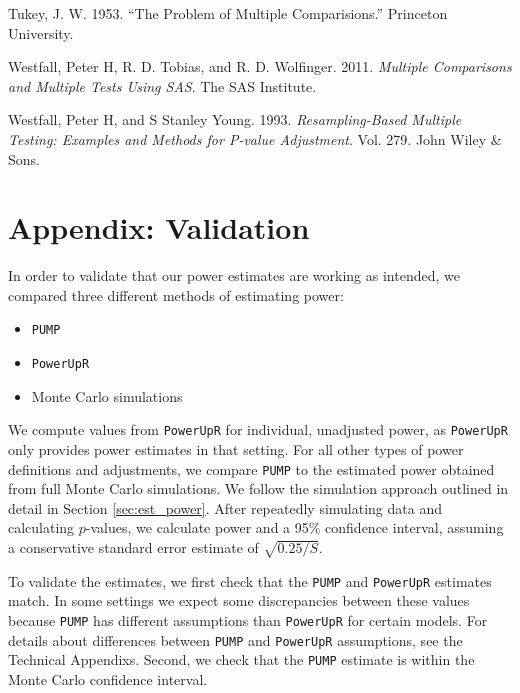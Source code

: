 \documentclass{article}
\providecommand{\tightlist}{%
  \setlength{\itemsep}{0pt}\setlength{\parskip}{0pt}}
\newlength{\cslhangindent}
\newlength{\cslentryspacingunit} %
\newenvironment{CSLReferences}[2] %
 {%
  \setlength{\parindent}{0pt}
  \ifodd #1
  \let\oldpar\par
  \def\par{\hangindent=\cslhangindent\oldpar}
  \fi
  \setlength{\parskip}{#2\cslentryspacingunit}
 }%
 {}
\begin{document}
\begin{CSLReferences}{1}{0}
\leavevmode{}%
Tukey, J. W. 1953. {``The Problem of Multiple Comparisions.''} Princeton
University.

\leavevmode{}%
Westfall, Peter H, R. D. Tobias, and R. D. Wolfinger. 2011.
\emph{Multiple Comparisons and Multiple Tests Using SAS}. The SAS
Institute.

\leavevmode{}%
Westfall, Peter H, and S Stanley Young. 1993. \emph{Resampling-Based
Multiple Testing: Examples and Methods for {P-value} Adjustment}. Vol.
279. John Wiley \& Sons.

\end{CSLReferences}

\section*{Appendix: Validation}

In order to validate that our power estimates are working as intended,
we compared three different methods of estimating power:

\begin{itemize}
\tightlist
\item
  \texttt{PUMP}
\item
  \texttt{PowerUpR}
\item
  Monte Carlo simulations
\end{itemize}

We compute values from \texttt{PowerUpR} for individual, unadjusted
power, as \texttt{PowerUpR} only provides power estimates in that
setting. For all other types of power definitions and adjustments, we
compare \texttt{PUMP} to the estimated power obtained from full Monte
Carlo simulations. We follow the simulation approach outlined in detail
in Section \ref{sec:est_power}. After repeatedly simulating data and
calculating \(p\)-values, we calculate power and a 95\% confidence
interval, assuming a conservative standard error estimate of
\(\sqrt{0.25/S}\).

To validate the estimates, we first check that the \texttt{PUMP} and
\texttt{PowerUpR} estimates match. In some settings we expect some
discrepancies between these values because \texttt{PUMP} has different
assumptions than \texttt{PowerUpR} for certain models. For details about
differences between \texttt{PUMP} and \texttt{PowerUpR} assumptions, see
the Technical Appendixs. Second, we check that the \texttt{PUMP}
estimate is within the Monte Carlo confidence interval.
\end{document}
